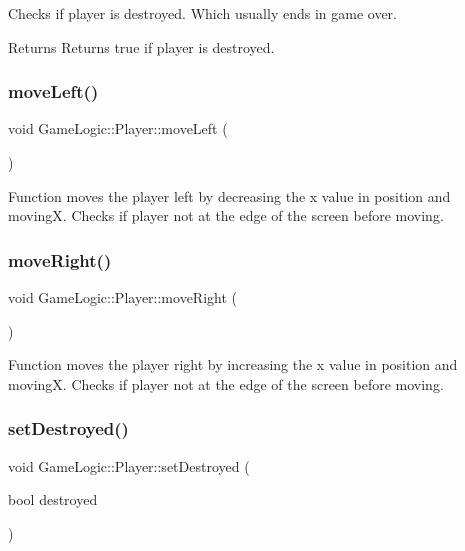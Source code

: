 Checks if player is destroyed. Which usually ends in game over. \begin{DoxyReturn}{Returns}
Returns true if player is destroyed. 
\end{DoxyReturn}
\mbox{\label{classGameLogic_1_1Player_a0595d93baa8c135aec8b9a6febc5d18c}} 
\subsubsection{\texorpdfstring{move\+Left()}{moveLeft()}}
{\footnotesize\ttfamily void Game\+Logic\+::\+Player\+::move\+Left (\begin{DoxyParamCaption}{ }\end{DoxyParamCaption})}

Function moves the player left by decreasing the x value in position and movingX. Checks if player not at the edge of the screen before moving. \mbox{\label{classGameLogic_1_1Player_a42e5ab72dddca42e2ea2bbdeed63995e}} 
\subsubsection{\texorpdfstring{move\+Right()}{moveRight()}}
{\footnotesize\ttfamily void Game\+Logic\+::\+Player\+::move\+Right (\begin{DoxyParamCaption}{ }\end{DoxyParamCaption})}

Function moves the player right by increasing the x value in position and movingX. Checks if player not at the edge of the screen before moving. \mbox{\label{classGameLogic_1_1Player_a1f866a43d2db9e5f3dbeca80cbba28a7}} 
\subsubsection{\texorpdfstring{set\+Destroyed()}{setDestroyed()}}
{\footnotesize\ttfamily void Game\+Logic\+::\+Player\+::set\+Destroyed (\begin{DoxyParamCaption}\item[{bool}]{destroyed }\end{DoxyParamCaption})}

